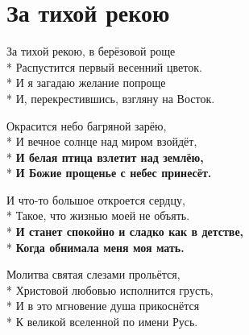 \section{За тихой рекою}
\label{song:За_тихой_рекою}

\medskip

\begin{minipage}{\linewidth}
За тихой рекою, в берёзовой роще\\*
Распустится первый весенний цветок.\\*
И я загадаю желание попроще\\*
И, перекрестившись, взгляну на Восток.\\
\end{minipage}\par\medskip\nobreak

\medskip

\begin{minipage}{\linewidth}
Окрасится небо багряной зарёю,\\*
И вечное солнце над миром взойдёт,\\*
\textbf{И белая птица взлетит над землёю,}\\*
\textbf{И Божие прощенье с небес принесёт.}\\
\end{minipage}\par\medskip\nobreak

\medskip

\begin{minipage}{\linewidth}
И что-то большое откроется сердцу,\\*
Такое, что жизнью моей не объять.\\*
\textbf{И станет спокойно и сладко как в детстве,}\\*
\textbf{Когда обнимала меня моя мать.}\\
\end{minipage}\par\medskip\nobreak

\medskip

\begin{minipage}{\linewidth}
Молитва святая слезами прольётся,\\*
Христовой любовью исполнится грусть,\\*
И в это мгновение душа прикоснётся\\*
К великой вселенной по имени Русь.\\
\end{minipage}

